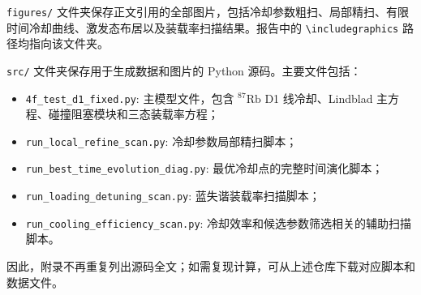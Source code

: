 \documentclass[UTF8,a4paper,12pt]{ctexart}
\newcommand{\Rb}{\ensuremath{^{87}\mathrm{Rb}}}
\begin{document}
\texttt{figures/} 文件夹保存正文引用的全部图片，包括冷却参数粗扫、局部精扫、有限时间冷却曲线、激发态布居以及装载率扫描结果。报告中的 \texttt{\textbackslash includegraphics} 路径均指向该文件夹。

\texttt{src/} 文件夹保存用于生成数据和图片的 Python 源码。主要文件包括：
\begin{itemize}
  \item \texttt{4f\_test\_d1\_fixed.py}: 主模型文件，包含 \Rb{} D1 线冷却、Lindblad 主方程、碰撞阻塞模块和三态装载率方程；
  \item \texttt{run\_local\_refine\_scan.py}: 冷却参数局部精扫脚本；
  \item \texttt{run\_best\_time\_evolution\_diag.py}: 最优冷却点的完整时间演化脚本；
  \item \texttt{run\_loading\_detuning\_scan.py}: 蓝失谐装载率扫描脚本；
  \item \texttt{run\_cooling\_efficiency\_scan.py}: 冷却效率和候选参数筛选相关的辅助扫描脚本。
\end{itemize}

因此，附录不再重复列出源码全文；如需复现计算，可从上述仓库下载对应脚本和数据文件。
\end{document}
